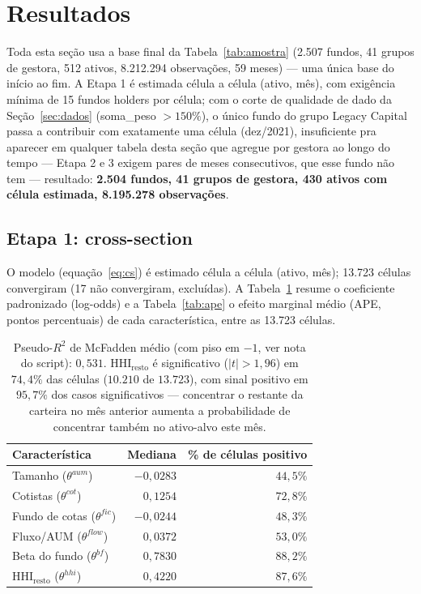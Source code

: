 \documentclass[11pt,a4paper]{article}
\begin{document}
\section{Resultados}
\label{sec:resultados}

Toda esta seção usa a base final da Tabela~\ref{tab:amostra} (2.507 fundos, 41 grupos de
gestora, 512 ativos, 8.212.294 observações, 59 meses) --- uma única base do início ao fim. A
Etapa 1 é estimada célula a célula (ativo, mês), com exigência mínima de 15 fundos holders por
célula; com o corte de qualidade de dado da Seção~\ref{sec:dados} (soma\_peso $>150\%$), o
único fundo do grupo Legacy Capital passa a contribuir com
exatamente uma célula (dez/2021), insuficiente pra aparecer em qualquer tabela desta seção que
agregue por gestora ao longo do tempo --- Etapa 2 e 3 exigem pares de meses consecutivos, que
esse fundo não tem --- resultado:
\textbf{2.504 fundos, 41 grupos de gestora, 430 ativos com célula estimada, 8.195.278
observações}.

\FloatBarrier
\subsection{Etapa 1: cross-section}

O modelo (equação~\eqref{eq:cs}) é estimado célula a célula (ativo, mês); 13.723 células
convergiram (17 não convergiram, excluídas). A Tabela~\ref{tab:theta} resume o coeficiente
padronizado (log-odds) e a Tabela~\ref{tab:ape} o efeito marginal médio (APE, pontos percentuais)
de cada característica, entre as 13.723 células.

\begin{table}[h]\centering\small
\caption{Coeficiente padronizado (log-odds) de cada característica, mediana e \% de células com
sinal positivo, entre 13.723 células (ativo, mês). Fonte: script
\texttt{99\_pipeline\_hhi\_lag\_etapa1.R} $\to$ \texttt{theta\_multiativo.csv}.}
\label{tab:theta}
\begin{tabular}{@{}lrr@{}}
\toprule
Característica & Mediana & \% de células positivo \\
\midrule
Tamanho ($\theta^{aum}$) & $-0{,}0283$ & $44{,}5\%$ \\
Cotistas ($\theta^{cot}$) & $0{,}1254$ & $72{,}8\%$ \\
Fundo de cotas ($\theta^{fic}$) & $-0{,}0244$ & $48{,}3\%$ \\
Fluxo/AUM ($\theta^{flow}$) & $0{,}0372$ & $53{,}0\%$ \\
Beta do fundo ($\theta^{bf}$) & $0{,}7830$ & $88{,}2\%$ \\
$\text{HHI}_{\text{resto}}$ ($\theta^{hhi}$) & $0{,}4220$ & $87{,}6\%$ \\
\bottomrule
\end{tabular}
\caption*{\footnotesize Pseudo-$R^2$ de McFadden médio (com piso em $-1$, ver nota do script): $0{,}531$.
$\text{HHI}_{\text{resto}}$ é significativo ($|t|>1{,}96$) em $74{,}4\%$ das células ($10.210$ de
$13.723$), com sinal positivo em $95{,}7\%$ dos casos significativos --- concentrar o restante da
carteira no mês anterior aumenta a probabilidade de concentrar também no ativo-alvo este mês.}
\end{table}
\end{document}
